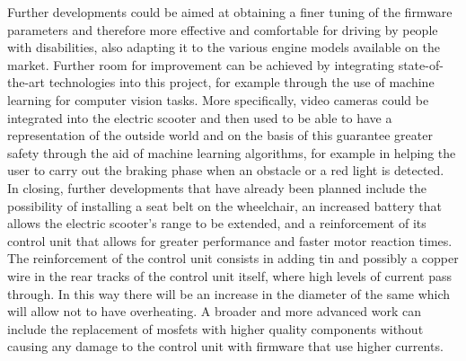 \documentclass[binding=0.6cm,LaM,noexaminfo]{sapthesis}
\begin{document}
Further developments could be aimed at obtaining a finer tuning of the firmware parameters and therefore more effective and comfortable for driving by people with disabilities, also adapting it to the various engine models available on the market. Further room for improvement can be achieved by integrating state-of-the-art technologies into this project, for example through the use of machine learning for computer vision tasks. More specifically, video cameras could be integrated into the electric scooter and then used to be able to have a representation of the outside world and on the basis of this guarantee greater safety through the aid of machine learning algorithms, for example in helping the user to carry out the braking phase when an obstacle or a red light is detected.\\
In closing, further developments that have already been planned include the possibility of installing a seat belt on the wheelchair, an increased battery that allows the electric scooter's range to be extended, and a reinforcement of its control unit that allows for greater performance and faster motor reaction times. The reinforcement of the control unit consists in adding tin and possibly a copper wire in the rear tracks of the control unit itself, where high levels of current pass through. In this way there will be an increase in the diameter of the same which will allow not to have overheating. A broader and more advanced work can include the replacement of mosfets with higher quality components without causing any damage to the control unit with firmware that use higher currents.

\backmatter


\lstlistoflistings
{}
\listoffigures
{}

\cleardoublepage
{}


\backmatter
\nocite{*}
\printbibliography
\end{document}
